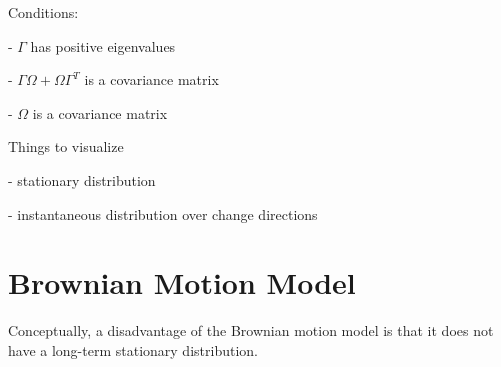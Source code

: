 \documentclass[11pt,a4paper]{article}
\begin{document}
Conditions:

- $\Gamma$ has positive eigenvalues

- $\Gamma\Omega+\Omega\Gamma^T$ is a covariance matrix

- $\Omega$ is a covariance matrix

Things to visualize

- stationary distribution

- instantaneous distribution over change directions


\section{Brownian Motion Model}

Conceptually, a disadvantage of the Brownian motion model is that it does not have a long-term stationary distribution.

\end{document}
